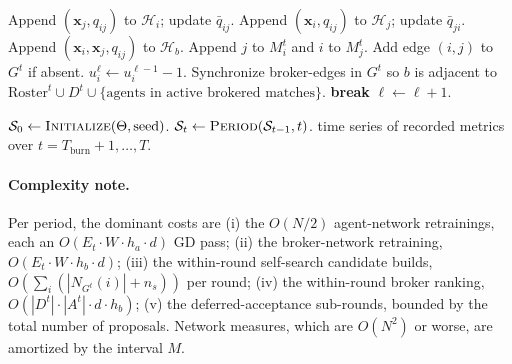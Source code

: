 \documentclass[11pt]{article}
\newcommand{\x}{\mathbf{x}}
\newcommand{\Roster}{\mathrm{Roster}}
\newcommand{\Hist}{\mathcal{H}}
\newcommand{\Ntot}{N}
\begin{document}
\begin{algorithm}[H]
\begin{algorithmic}[1]
    \STATE Append $(\x_j,q_{ij})$ to $\Hist_i$; update $\bar q_{ij}$. Append $(\x_i,q_{ij})$ to $\Hist_j$; update $\bar q_{ji}$.
      \STATE Append $(\x_i,\x_j,q_{ij})$ to $\Hist_b$.
    \ENDIF
    \STATE Append $j$ to $M_i^t$ and $i$ to $M_j^t$.
    \STATE Add edge $(i,j)$ to $G^t$ if absent.
    \STATE $u_i^\ell\gets u_i^{\ell-1}-1$.
  \ENDFOR
  \STATE Synchronize broker-edges in $G^t$ so $b$ is adjacent to $\Roster^t\cup D^t\cup\{\text{agents in active brokered matches}\}$.
    \STATE \textbf{break}
  \ENDIF
  \STATE $\ell\gets\ell+1$.
\ENDLOOP
\end{algorithmic}
\end{algorithm}

\begin{algorithm}[H]
\caption{\textsc{RunSimulation}$(\Theta,\text{seed})$. Top-level driver.}\label{alg:main}
\begin{algorithmic}[1]
\STATE $\mathcal{S}_0\gets\textsc{Initialize}(\Theta,\text{seed})$.
  \STATE $\mathcal{S}_t\gets\textsc{Period}(\mathcal{S}_{t-1},t)$.
\ENDFOR
\RETURN time series of recorded metrics over $t=T_{\text{burn}}+1,\ldots,T$.
\end{algorithmic}
\end{algorithm}

\paragraph{Complexity note.} Per period, the dominant costs are (i) the $O(\Ntot/2)$ agent-network retrainings, each an $O(E_t\cdot W\cdot h_a\cdot d)$ GD pass; (ii) the broker-network retraining, $O(E_t\cdot W\cdot h_b\cdot d)$; (iii) the within-round self-search candidate builds, $O(\sum_i (|N_{G^t}(i)|+n_s))$ per round; (iv) the within-round broker ranking, $O(|D^t|\cdot|A^t|\cdot d\cdot h_b)$; (v) the deferred-acceptance sub-rounds, bounded by the total number of proposals. Network measures, which are $O(\Ntot^2)$ or worse, are amortized by the interval $M$.
\end{document}
